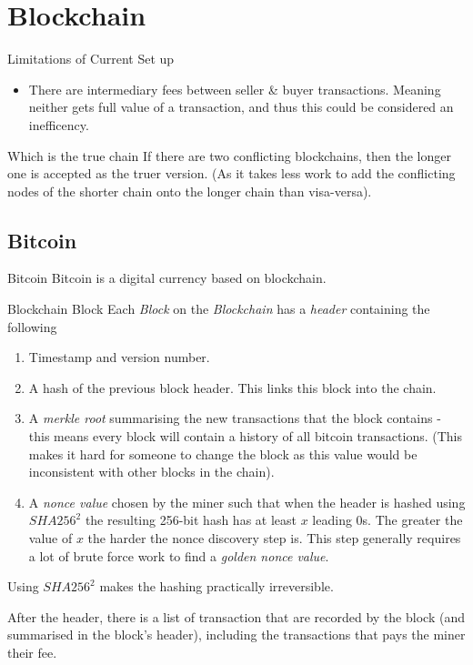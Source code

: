 \documentclass[11pt,a4paper]{article}
\begin{document}
\section{Blockchain}

\begin{remark}{Limitations of Current Set up}
  \begin{itemize}
    \item There are intermediary fees between seller \& buyer transactions. Meaning neither gets full value of a transaction, and thus this could be considered an inefficency.
  \end{itemize}
\end{remark}

\begin{remark}{Which is the true chain}
  If there are two conflicting blockchains, then the longer one is accepted as the truer version. (As it takes less work to add the conflicting nodes of the shorter chain onto the longer chain than visa-versa).
\end{remark}

\subsection{Bitcoin}

\begin{definition}{Bitcoin}
  Bitcoin is a digital currency based on blockchain.
\end{definition}

\begin{definition}{Blockchain Block}
  Each \textit{Block} on the \textit{Blockchain} has a \textit{header} containing the following
  \begin{enumerate}
    \item Timestamp and version number.
    \item A hash of the previous block header. This links this block into the chain.
    \item A \textit{merkle root} summarising the new transactions that the block contains - this means every block will contain a history of all bitcoin transactions. (This makes it hard for someone to change the block as this value would be inconsistent with other blocks in the chain).
    \item A \textit{nonce value} chosen by the miner such that when the header is hashed using $SHA256^2$ the resulting 256-bit hash has at least $x$ leading 0s. The greater the value of $x$ the harder the nonce discovery step is. This step generally requires a lot of brute force work to find a \textit{golden nonce value}.
  \end{enumerate}
  \par Using $SHA256^2$ makes the hashing practically irreversible.
  \par After the header, there is a list of transaction that are recorded by the block (and summarised in the block's header), including the transactions that pays the miner their fee.
\end{definition}
\end{document}
